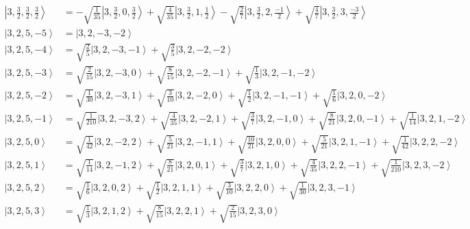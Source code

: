 \documentclass{report}
\newcommand{\ket}[1]{\left| #1 \right>} %
\begin{document}
\begin{align*}
\ket{ 3 ,  \frac{3}{2} ,  \frac{3}{2} ,  \frac{3}{2}  } &=  - \sqrt{  \frac{1}{35}  } \ket{ 3 ,  \frac{3}{2} ,  0 ,  \frac{3}{2}  } + \sqrt{  \frac{4}{35}  } \ket{ 3 ,  \frac{3}{2} ,  1 ,  \frac{1}{2}  } - \sqrt{  \frac{2}{7}  } \ket{ 3 ,  \frac{3}{2} ,  2 ,  \frac{-1}{2}  } + \sqrt{  \frac{4}{7}  } \ket{ 3 ,  \frac{3}{2} ,  3 ,  \frac{-3}{2}  } \\
\ket{ 3 ,  2 ,  5 ,  -5  } &=  \ket{ 3 ,  2 ,  -3 ,  -2  } \\
\ket{ 3 ,  2 ,  5 ,  -4  } &=  \sqrt{  \frac{2}{5}  } \ket{ 3 ,  2 ,  -3 ,  -1  } + \sqrt{  \frac{3}{5}  } \ket{ 3 ,  2 ,  -2 ,  -2  } \\
\ket{ 3 ,  2 ,  5 ,  -3  } &=  \sqrt{  \frac{2}{15}  } \ket{ 3 ,  2 ,  -3 ,  0  } + \sqrt{  \frac{8}{15}  } \ket{ 3 ,  2 ,  -2 ,  -1  } + \sqrt{  \frac{1}{3}  } \ket{ 3 ,  2 ,  -1 ,  -2  } \\
\ket{ 3 ,  2 ,  5 ,  -2  } &=  \sqrt{  \frac{1}{30}  } \ket{ 3 ,  2 ,  -3 ,  1  } + \sqrt{  \frac{3}{10}  } \ket{ 3 ,  2 ,  -2 ,  0  } + \sqrt{  \frac{1}{2}  } \ket{ 3 ,  2 ,  -1 ,  -1  } + \sqrt{  \frac{1}{6}  } \ket{ 3 ,  2 ,  0 ,  -2  } \\
\ket{ 3 ,  2 ,  5 ,  -1  } &=  \sqrt{  \frac{1}{210}  } \ket{ 3 ,  2 ,  -3 ,  2  } + \sqrt{  \frac{4}{35}  } \ket{ 3 ,  2 ,  -2 ,  1  } + \sqrt{  \frac{3}{7}  } \ket{ 3 ,  2 ,  -1 ,  0  } + \sqrt{  \frac{8}{21}  } \ket{ 3 ,  2 ,  0 ,  -1  } + \sqrt{  \frac{1}{14}  } \ket{ 3 ,  2 ,  1 ,  -2  } \\
\ket{ 3 ,  2 ,  5 ,  0  } &=  \sqrt{  \frac{1}{42}  } \ket{ 3 ,  2 ,  -2 ,  2  } + \sqrt{  \frac{5}{21}  } \ket{ 3 ,  2 ,  -1 ,  1  } + \sqrt{  \frac{10}{21}  } \ket{ 3 ,  2 ,  0 ,  0  } + \sqrt{  \frac{5}{21}  } \ket{ 3 ,  2 ,  1 ,  -1  } + \sqrt{  \frac{1}{42}  } \ket{ 3 ,  2 ,  2 ,  -2  } \\
\ket{ 3 ,  2 ,  5 ,  1  } &=  \sqrt{  \frac{1}{14}  } \ket{ 3 ,  2 ,  -1 ,  2  } + \sqrt{  \frac{8}{21}  } \ket{ 3 ,  2 ,  0 ,  1  } + \sqrt{  \frac{3}{7}  } \ket{ 3 ,  2 ,  1 ,  0  } + \sqrt{  \frac{4}{35}  } \ket{ 3 ,  2 ,  2 ,  -1  } + \sqrt{  \frac{1}{210}  } \ket{ 3 ,  2 ,  3 ,  -2  } \\
\ket{ 3 ,  2 ,  5 ,  2  } &=  \sqrt{  \frac{1}{6}  } \ket{ 3 ,  2 ,  0 ,  2  } + \sqrt{  \frac{1}{2}  } \ket{ 3 ,  2 ,  1 ,  1  } + \sqrt{  \frac{3}{10}  } \ket{ 3 ,  2 ,  2 ,  0  } + \sqrt{  \frac{1}{30}  } \ket{ 3 ,  2 ,  3 ,  -1  } \\
\ket{ 3 ,  2 ,  5 ,  3  } &=  \sqrt{  \frac{1}{3}  } \ket{ 3 ,  2 ,  1 ,  2  } + \sqrt{  \frac{8}{15}  } \ket{ 3 ,  2 ,  2 ,  1  } + \sqrt{  \frac{2}{15}  } \ket{ 3 ,  2 ,  3 ,  0  } \\

\end{align*}
\end{document}
